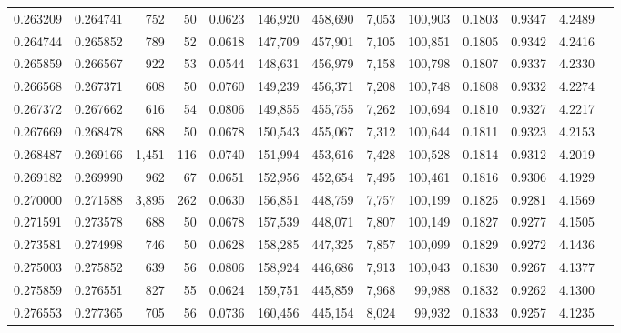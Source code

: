 \begin{tabular}{rrrrrrrrrrrrr}
0.263209 & 0.264741 &   752 &  50 &                                     0.0623 & 146,920 & 458,690 &   7,053 & 100,903 & 0.1803 & 0.9347 & 4.2489 \\
0.264744 & 0.265852 &   789 &  52 &                                     0.0618 & 147,709 & 457,901 &   7,105 & 100,851 & 0.1805 & 0.9342 & 4.2416 \\
0.265859 & 0.266567 &   922 &  53 &                                     0.0544 & 148,631 & 456,979 &   7,158 & 100,798 & 0.1807 & 0.9337 & 4.2330 \\
0.266568 & 0.267371 &   608 &  50 &                                     0.0760 & 149,239 & 456,371 &   7,208 & 100,748 & 0.1808 & 0.9332 & 4.2274 \\
0.267372 & 0.267662 &   616 &  54 &                                     0.0806 & 149,855 & 455,755 &   7,262 & 100,694 & 0.1810 & 0.9327 & 4.2217 \\
0.267669 & 0.268478 &   688 &  50 &                                     0.0678 & 150,543 & 455,067 &   7,312 & 100,644 & 0.1811 & 0.9323 & 4.2153 \\
0.268487 & 0.269166 & 1,451 & 116 &                                     0.0740 & 151,994 & 453,616 &   7,428 & 100,528 & 0.1814 & 0.9312 & 4.2019 \\
0.269182 & 0.269990 &   962 &  67 &                                     0.0651 & 152,956 & 452,654 &   7,495 & 100,461 & 0.1816 & 0.9306 & 4.1929 \\
0.270000 & 0.271588 & 3,895 & 262 &                                     0.0630 & 156,851 & 448,759 &   7,757 & 100,199 & 0.1825 & 0.9281 & 4.1569 \\
0.271591 & 0.273578 &   688 &  50 &                                     0.0678 & 157,539 & 448,071 &   7,807 & 100,149 & 0.1827 & 0.9277 & 4.1505 \\
0.273581 & 0.274998 &   746 &  50 &                                     0.0628 & 158,285 & 447,325 &   7,857 & 100,099 & 0.1829 & 0.9272 & 4.1436 \\
0.275003 & 0.275852 &   639 &  56 &                                     0.0806 & 158,924 & 446,686 &   7,913 & 100,043 & 0.1830 & 0.9267 & 4.1377 \\
0.275859 & 0.276551 &   827 &  55 &                                     0.0624 & 159,751 & 445,859 &   7,968 &  99,988 & 0.1832 & 0.9262 & 4.1300 \\
0.276553 & 0.277365 &   705 &  56 &                                     0.0736 & 160,456 & 445,154 &   8,024 &  99,932 & 0.1833 & 0.9257 & 4.1235 \\

\end{tabular}
